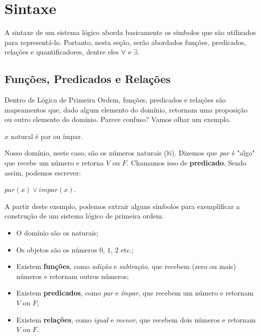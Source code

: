 \section{Sintaxe}

    A sintaxe de um sistema lógico aborda basicamente os símbolos que são utilizados para representá-lo. Portanto, nesta seção, serão abordados funções, predicados, relações e quantificadores, dentre eles $\forall$ e $\exists$.

    \subsection{Funções, Predicados e Relações}

        Dentro de Lógica de Primeira Ordem, funções, predicados e relações são mapeamentos que, dado algum elemento do domínio, retornam uma proposição ou outro elemento do domínio. Parece confuso? Vamos olhar um exemplo.

        \begin{center}
            $x$ natural é par ou ímpar.            
        \end{center}

        Nosso domínio, neste caso, são os números naturais ($\mathbb{N}$). Dizemos que \textit{par} é "algo" que recebe um número e retorna $V$ ou $F$. Chamamos isso de \textbf{predicado}. Sendo assim, podemos escrever:

        \begin{center}
            $par(x) \lor impar(x)$.
        \end{center}

        A partir deste exemplo, podemos extrair alguns símbolos para exemplificar a construção de um sistema lógico de primeira ordem.

        \begin{itemize}
            \item O domínio são os naturais;
            \item Os objetos são os números $0$, $1$, $2$ etc.;
            \item Existem \textbf{funções}, como \textit{adição} e \textit{subtração}, que recebem (zero ou mais) números e retornam outros números;
            \item Existem \textbf{predicados}, como \textit{par} e \textit{ímpar}, que recebem um número e retornam $V$ ou $F$;
            \item Existem \textbf{relações}, como \textit{igual} e \textit{menor}, que recebem dois números e retornam $V$ ou $F$.
        \end{itemize}

